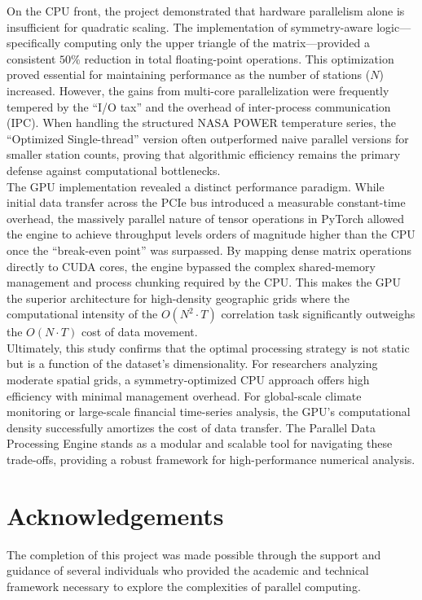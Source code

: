 On the CPU front, the project demonstrated that hardware parallelism alone is insufficient for quadratic scaling. The implementation of symmetry-aware logic—specifically computing only the upper triangle of the matrix—provided a consistent $50\%$ reduction in total floating-point operations. This optimization proved essential for maintaining performance as the number of stations ($N$) increased. However, the gains from multi-core parallelization were frequently tempered by the ``I/O tax'' and the overhead of inter-process communication (IPC). When handling the structured NASA POWER temperature series, the ``Optimized Single-thread'' version often outperformed naive parallel versions for smaller station counts, proving that algorithmic efficiency remains the primary defense against computational bottlenecks.\\

The GPU implementation revealed a distinct performance paradigm. While initial data transfer across the PCIe bus introduced a measurable constant-time overhead, the massively parallel nature of tensor operations in PyTorch allowed the engine to achieve throughput levels orders of magnitude higher than the CPU once the ``break-even point'' was surpassed. By mapping dense matrix operations directly to CUDA cores, the engine bypassed the complex shared-memory management and process chunking required by the CPU. This makes the GPU the superior architecture for high-density geographic grids where the computational intensity of the $O(N^2 \cdot T)$ correlation task significantly outweighs the $O(N \cdot T)$ cost of data movement.\\

Ultimately, this study confirms that the optimal processing strategy is not static but is a function of the dataset’s dimensionality. For researchers analyzing moderate spatial grids, a symmetry-optimized CPU approach offers high efficiency with minimal management overhead. For global-scale climate monitoring or large-scale financial time-series analysis, the GPU’s computational density successfully amortizes the cost of data transfer. The Parallel Data Processing Engine stands as a modular and scalable tool for navigating these trade-offs, providing a robust framework for high-performance numerical analysis.

\section{Acknowledgements}
The completion of this project was made possible through the support and guidance of several individuals who provided the academic and technical framework necessary to explore the complexities of parallel computing.\\

